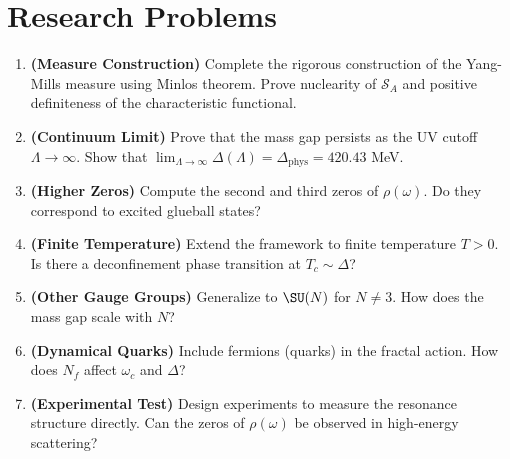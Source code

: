 \section*{Research Problems}

\begin{enumerate}
\item \textbf{(Measure Construction)} Complete the rigorous construction of the Yang-Mills measure using Minlos theorem. Prove nuclearity of $\mathcal{S}_A$ and positive definiteness of the characteristic functional.

\item \textbf{(Continuum Limit)} Prove that the mass gap persists as the UV cutoff $\Lambda \to \infty$. Show that $\lim_{\Lambda \to \infty} \Delta(\Lambda) = \Delta_{\text{phys}} = 420.43$ MeV.

\item \textbf{(Higher Zeros)} Compute the second and third zeros of $\rho(\omega)$. Do they correspond to excited glueball states?

\item \textbf{(Finite Temperature)} Extend the framework to finite temperature $T > 0$. Is there a deconfinement phase transition at $T_c \sim \Delta$?

\item \textbf{(Other Gauge Groups)} Generalize to $\SU(N)$ for $N \neq 3$. How does the mass gap scale with $N$?

\item \textbf{(Dynamical Quarks)} Include fermions (quarks) in the fractal action. How does $N_f$ affect $\omega_c$ and $\Delta$?

\item \textbf{(Experimental Test)} Design experiments to measure the resonance structure directly. Can the zeros of $\rho(\omega)$ be observed in high-energy scattering?
\end{enumerate}
